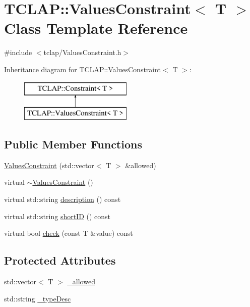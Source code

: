\hypertarget{class_t_c_l_a_p_1_1_values_constraint}{}\section{T\+C\+L\+A\+P\+:\+:Values\+Constraint$<$ T $>$ Class Template Reference}
\label{class_t_c_l_a_p_1_1_values_constraint}


{\ttfamily \#include $<$tclap/\+Values\+Constraint.\+h$>$}

Inheritance diagram for T\+C\+L\+A\+P\+:\+:Values\+Constraint$<$ T $>$\+:\begin{figure}[H]
\begin{center}
\leavevmode
\includegraphics[height=2.000000cm]{class_t_c_l_a_p_1_1_values_constraint}
\end{center}
\end{figure}
\subsection*{Public Member Functions}
\begin{DoxyCompactItemize}
\item 
\hyperlink{class_t_c_l_a_p_1_1_values_constraint_a8ab127461012bb1dcfac159e17105db9}{Values\+Constraint} (std\+::vector$<$ T $>$ \&allowed)
\item 
virtual \hyperlink{class_t_c_l_a_p_1_1_values_constraint_a9b0c218300a9e0937386f2e566ba21bd}{$\sim$\+Values\+Constraint} ()
\item 
virtual std\+::string \hyperlink{class_t_c_l_a_p_1_1_values_constraint_a07b08c05a7bfcbe5815895353ffef1d5}{description} () const 
\item 
virtual std\+::string \hyperlink{class_t_c_l_a_p_1_1_values_constraint_a1bbe12afcb1f185ee7ac808d69e2d345}{short\+I\+D} () const 
\item 
virtual bool \hyperlink{class_t_c_l_a_p_1_1_values_constraint_ae132b185413cf5dea5cc040f60e7ede6}{check} (const T \&value) const 
\end{DoxyCompactItemize}
\subsection*{Protected Attributes}
\begin{DoxyCompactItemize}
\item 
std\+::vector$<$ T $>$ \hyperlink{class_t_c_l_a_p_1_1_values_constraint_ac43fa83688358c0ad06157053cce347a}{\+\_\+allowed}
\item 
std\+::string \hyperlink{class_t_c_l_a_p_1_1_values_constraint_a6ebc63fa5eea116a50aa5f76aee56fd6}{\+\_\+type\+Desc}
\end{DoxyCompactItemize}


